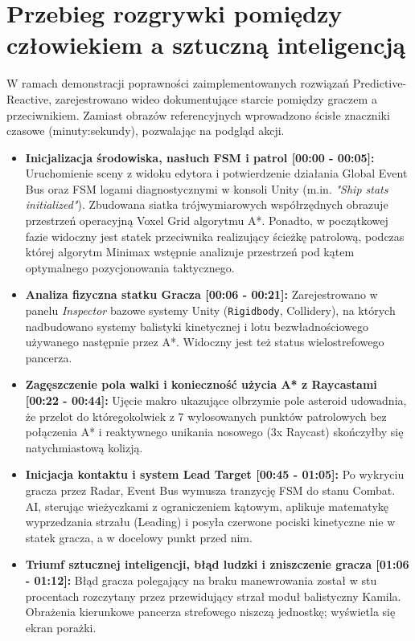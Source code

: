 \documentclass[12pt, a4paper]{article}
\begin{document}
\section{Przebieg rozgrywki pomiędzy człowiekiem a sztuczną inteligencją}
W ramach demonstracji poprawności zaimplementowanych rozwiązań Predictive-Reactive, zarejestrowano wideo dokumentujące starcie pomiędzy graczem a przeciwnikiem. Zamiast obrazów referencyjnych wprowadzono ścisłe znaczniki czasowe (minuty:sekundy), pozwalając na podgląd akcji.

\begin{itemize}
    \item \textbf{Inicjalizacja środowiska, nasłuch FSM i patrol [00:00 - 00:05]:} Uruchomienie sceny z widoku edytora i potwierdzenie działania Global Event Bus oraz FSM logami diagnostycznymi w konsoli Unity (m.in. \textit{"Ship stats initialized"}). Zbudowana siatka trójwymiarowych współrzędnych obrazuje przestrzeń operacyjną Voxel Grid algorytmu A*. Ponadto, w początkowej fazie widoczny jest statek przeciwnika realizujący ścieżkę patrolową, podczas której algorytm Minimax wstępnie analizuje przestrzeń pod kątem optymalnego pozycjonowania taktycznego.
    
    \item \textbf{Analiza fizyczna statku Gracza [00:06 - 00:21]:} Zarejestrowano w panelu \textit{Inspector} bazowe systemy Unity (\texttt{Rigidbody}, Collidery), na których nadbudowano systemy balistyki kinetycznej i lotu bezwładnościowego używanego następnie przez A*. Widoczny jest też status wielostrefowego pancerza.
    
    \item \textbf{Zagęszczenie pola walki i konieczność użycia A* z Raycastami [00:22 - 00:44]:} Ujęcie makro ukazujące olbrzymie pole asteroid udowadnia, że przelot do któregokolwiek z 7 wylosowanych punktów patrolowych bez połączenia A* i reaktywnego unikania nosowego (3x Raycast) skończyłby się natychmiastową kolizją.
    
    \item \textbf{Inicjacja kontaktu i system Lead Target [00:45 - 01:05]:} Po wykryciu gracza przez Radar, Event Bus wymusza tranzycję FSM do stanu Combat. AI, sterując wieżyczkami z ograniczeniem kątowym, aplikuje matematykę wyprzedzania strzału (Leading) i posyła czerwone pociski kinetyczne nie w statek gracza, a w docelowy punkt przed nim.
    
    \item \textbf{Triumf sztucznej inteligencji, błąd ludzki i zniszczenie gracza [01:06 - 01:12]:} Błąd gracza polegający na braku manewrowania został w stu procentach rozczytany przez przewidujący strzał moduł balistyczny Kamila. Obrażenia kierunkowe pancerza strefowego niszczą jednostkę; wyświetla się ekran porażki.
    

\end{itemize}
\end{document}
